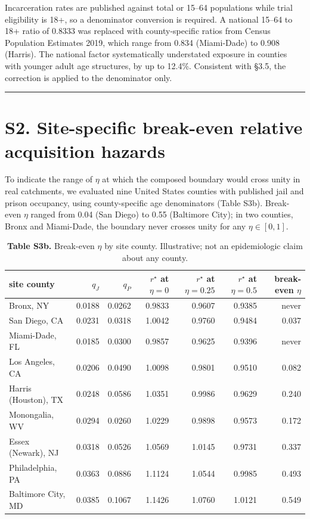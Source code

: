 Incarceration rates are published against total or 15--64 populations while trial eligibility is 18+, so a denominator conversion is required. A national 15--64 to 18+ ratio of 0.8333 was replaced with county-specific ratios from Census Population Estimates 2019, which range from 0.834 (Miami-Dade) to 0.908 (Harris). The national factor systematically understated exposure in counties with younger adult age structures, by up to 12.4\%. Consistent with §3.5, the correction is applied to the denominator only.

\begin{center}\rule{0.5\linewidth}{0.5pt}\end{center}

\section{S2. Site-specific break-even relative acquisition hazards}

To indicate the range of \(\eta\) at which the composed boundary would cross unity in real catchments, we evaluated nine United States counties with published jail and prison occupancy, using county-specific age denominators (Table S3b). Break-even \(\eta\) ranged from 0.04 (San Diego) to 0.55 (Baltimore City); in two counties, Bronx and Miami-Dade, the boundary never crosses unity for any \(\eta\in[0,1]\).

\begin{table}[htbp]
  \centering
  \small
  \caption*{\textbf{Table S3b.} Break-even $\eta$ by site county. Illustrative; not an epidemiologic claim about any county.}
  \label{tab:table_s3b}
  \begin{tabular}{lrrrrrr}
    \toprule
    site county & $q_J$ & $q_P$ & $r^\star$ at $\eta=0$ & $r^\star$ at $\eta=0.25$ & $r^\star$ at $\eta=0.5$ & break-even $\eta$ \\
    \midrule
    Bronx, NY & 0.0188 & 0.0262 & 0.9833 & 0.9607 & 0.9385 & never \\
    San Diego, CA & 0.0231 & 0.0318 & 1.0042 & 0.9760 & 0.9484 & 0.037 \\
    Miami-Dade, FL & 0.0185 & 0.0300 & 0.9857 & 0.9625 & 0.9396 & never \\
    Los Angeles, CA & 0.0206 & 0.0490 & 1.0098 & 0.9801 & 0.9510 & 0.082 \\
    Harris (Houston), TX & 0.0248 & 0.0586 & 1.0351 & 0.9986 & 0.9629 & 0.240 \\
    Monongalia, WV & 0.0294 & 0.0260 & 1.0229 & 0.9898 & 0.9573 & 0.172 \\
    Essex (Newark), NJ & 0.0318 & 0.0526 & 1.0569 & 1.0145 & 0.9731 & 0.337 \\
    Philadelphia, PA & 0.0363 & 0.0886 & 1.1124 & 1.0544 & 0.9985 & 0.493 \\
    Baltimore City, MD & 0.0385 & 0.1067 & 1.1426 & 1.0760 & 1.0121 & 0.549 \\
    \bottomrule
  \end{tabular}
\end{table}

